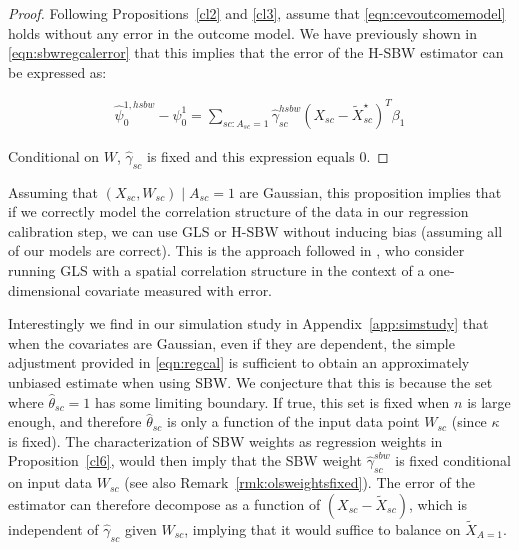 \begin{proof}
    Following Propositions~\ref{cl2} and \ref{cl3}, assume that \eqref{eqn:cevoutcomemodel} holds without any error in the outcome model. We have previously shown in \eqref{eqn:sbwregcalerror} that this implies that the error of the H-SBW estimator can be expressed as:
    
    \begin{align*}
        \hat{\psi}^{1, hsbw}_0 - \psi^1_0 = \sum_{sc: A_{sc} = 1}\hat{\gamma}^{hsbw}_{sc}(X_{sc} - \tilde{X}_{sc}^\star)^T\beta_1
    \end{align*}
    
    Conditional on $W$, $\hat{\gamma}_{sc}$ is fixed and this expression equals 0. 
\end{proof}

\begin{remark}
    Assuming that $(X_{sc}, W_{sc}) \mid A_{sc} = 1$ are Gaussian, this proposition implies that if we correctly model the correlation structure of the data in our regression calibration step, we can use GLS or H-SBW without inducing bias (assuming all of our models are correct). This is the approach followed in \cite{huque2014impact}, who consider running GLS with a spatial correlation structure in the context of a one-dimensional covariate measured with error. 
\end{remark}

\begin{remark}
        Interestingly we find in our simulation study in Appendix~\ref{app:simstudy} that when the covariates are Gaussian, even if they are dependent, the simple adjustment provided in \eqref{eqn:regcal} is sufficient to obtain an approximately unbiased estimate when using SBW. We conjecture that this is because the set where $\hat{\theta}_{sc} = 1$ has some limiting boundary. If true, this set is fixed when $n$ is large enough, and therefore $\hat{\theta}_{sc}$ is only a function of the input data point $W_{sc}$ (since $\kappa$ is fixed). The characterization of SBW weights as regression weights in Proposition~\ref{cl6}, would then imply that the SBW weight $\hat{\gamma}_{sc}^{sbw}$ is fixed conditional on input data $W_{sc}$ (see also Remark~\ref{rmk:olsweightsfixed}). The error of the estimator can therefore decompose as a function of $(X_{sc} - \tilde{X}_{sc})$, which is independent of $\hat{\gamma}_{sc}$ given $W_{sc}$, implying that it would suffice to balance on $\tilde{X}_{A=1}$.
\end{remark}

